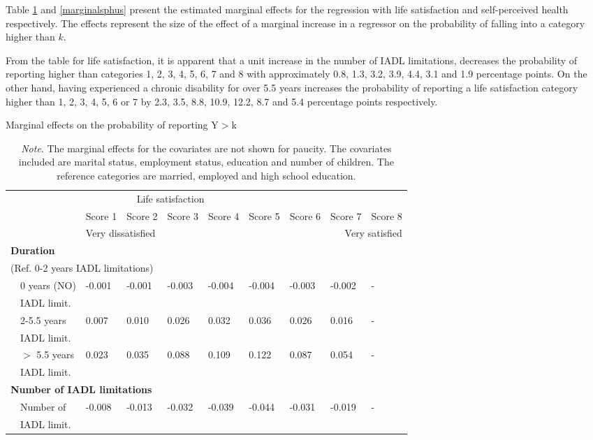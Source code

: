 \documentclass[12pt]{article}
\begin{document}
Table \ref{marginallifesat} and \ref{marginalsphus} present the estimated marginal effects for the regression with life satisfaction and self-perceived health respectively. The effects represent the size of the effect of a marginal increase in a regressor on the probability of falling into a category higher than $k$. 

From the table for life satisfaction, it is apparent that a unit increase in the number of IADL limitations, decreases the probability of reporting higher than categories 1, 2, 3, 4, 5, 6, 7 and 8 with approximately 0.8, 1.3, 3.2, 3.9, 4.4, 3.1 and 1.9 percentage points. On the other hand, having experienced a chronic disability for over 5.5 years increases the probability of reporting a life satisfaction category higher than 1, 2, 3, 4, 5, 6 or 7 by 2.3, 3.5, 8.8, 10.9, 12.2, 8.7 and 5.4 percentage points respectively.  

\begin{table}[htbp]
\centering
\footnotesize
\caption{Marginal effects on the probability of reporting Y$>$k}
\label{marginallifesat}
\begin{tabular}{ll llllllll}
\hline
& \multicolumn{7}{c}{Life satisfaction}\\
&          & Score 1 & Score 2 & Score 3 & Score 4 & Score 5 & Score 6 & Score 7 & Score 8\\
&          & \multicolumn{2}{l}{Very dissatisfied} & & & & &\multicolumn{2}{r}{Very satisfied}\\\hline\hline
\multicolumn{2}{l}{\textbf{Duration}} \\
\multicolumn{8}{l}{(Ref. 0-2 years IADL limitations)}\\
            & 0 years (NO) & -0.001 & -0.001 & -0.003 & -0.004 & -0.004 & -0.003 & -0.002 & - \\
            & IADL limit.  &&&&&&& \\
            & 2-5.5 years  &  0.007 &  0.010 &  0.026 &  0.032 &  0.036 &  0.026 &  0.016 & - \\
            & IADL limit.  &&&&&&& \\
            & $>$ 5.5 years&  0.023 &  0.035 &  0.088 &  0.109 &  0.122 &  0.087 &  0.054 & - \\
            & IADL limit.  &&&&&&& \\
\multicolumn{8}{l}{\textbf{Number of IADL limitations}}\\            
            & Number of    & -0.008 & -0.013 & -0.032 & -0.039 & -0.044 & -0.031 & -0.019 & - \\
            & IADL limit.  &&&&&&& \\
\hline
\end{tabular}
\caption*{\footnotesize{\textit{Note}. The marginal effects for the covariates are not shown for paucity. The covariates included are marital status, employment status, education and number of children. The reference categories are married, employed and high school education.}}
\end{table}
\end{document}

